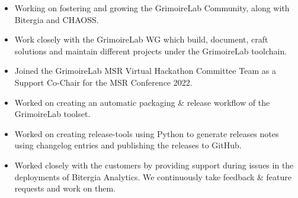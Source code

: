 \documentclass[10pt,a4paper]{style}
\begin{document}
\tagline{}

%

\begin{fullwidth}
\makecvheader
\end{fullwidth}

%




\begin{itemize}
    \item Working on fostering and growing the GrimoireLab Community, along with Bitergia and CHAOSS.
    \item Work closely with the GrimoireLab WG which build, document, craft solutions and maintain different projects under the GrimoireLab toolchain.
    \item Joined the GrimoireLab MSR Virtual Hackathon Committee Team as a Support Co-Chair for the MSR Conference 2022.
\end{itemize}

%

\divider


\begin{itemize}
	\item Worked on creating an automatic packaging \& release workflow of the GrimoireLab toolset.
	\item Worked on creating release-tools using Python to generate releases notes using changelog entries and publishing the releases to GitHub.
	\item Worked closely with the customers by providing support during issues in the deployments of Bitergia Analytics. We continuously take feedback \& feature requests and work on them.
\end{itemize}
\end{document}
